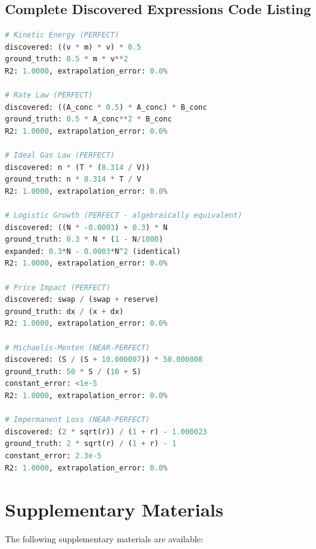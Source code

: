 \documentclass[twoside,11pt]{article}
\begin{document}
\subsection{Complete Discovered Expressions Code Listing}

\begin{lstlisting}[caption=Discovered Symbolic Expressions (7 Perfect Recoveries), label=lst:discovered, language=Python]
# Kinetic Energy (PERFECT)
discovered: ((v * m) * v) * 0.5
ground_truth: 0.5 * m * v**2
R2: 1.0000, extrapolation_error: 0.0%

# Rate Law (PERFECT)
discovered: ((A_conc * 0.5) * A_conc) * B_conc
ground_truth: 0.5 * A_conc**2 * B_conc
R2: 1.0000, extrapolation_error: 0.0%

# Ideal Gas Law (PERFECT)
discovered: n * (T * (8.314 / V))
ground_truth: n * 8.314 * T / V
R2: 1.0000, extrapolation_error: 0.0%

# Logistic Growth (PERFECT - algebraically equivalent)
discovered: ((N * -0.0003) + 0.3) * N
ground_truth: 0.3 * N * (1 - N/1000)
expanded: 0.3*N - 0.0003*N^2 (identical)
R2: 1.0000, extrapolation_error: 0.0%

# Price Impact (PERFECT)
discovered: swap / (swap + reserve)
ground_truth: dx / (x + dx)
R2: 1.0000, extrapolation_error: 0.0%

# Michaelis-Menten (NEAR-PERFECT)
discovered: (S / (S + 10.000007)) * 50.000008
ground_truth: 50 * S / (10 + S)
constant_error: <1e-5
R2: 1.0000, extrapolation_error: 0.0%

# Impermanent Loss (NEAR-PERFECT)
discovered: (2 * sqrt(r)) / (1 + r) - 1.000023
ground_truth: 2 * sqrt(r) / (1 + r) - 1
constant_error: 2.3e-5
R2: 1.0000, extrapolation_error: 0.0%
\end{lstlisting}



\section{Supplementary Materials}
\label{app:supplementary}

The following supplementary materials are available:
\end{document}
